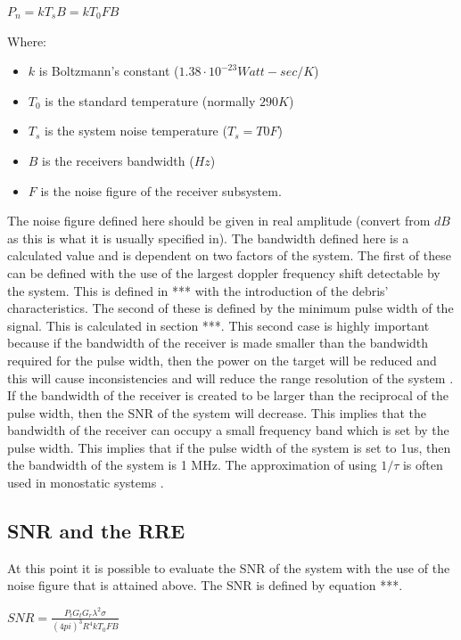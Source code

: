 \documentclass[11pt]{witseiepaper}
\begin{document}
$P_{n} = k T_{s} B = k T_{0} F B$

Where:
\begin{itemize}
    \item $k$ is Boltzmann's constant ($1.38 \cdot 10^{-23} Watt-sec/K$)
    \item $T_{0}$ is the standard temperature (normally $290 K$)
    \item $T_{s}$ is the system noise temperature ($T_{s} = T{0} F$)
    \item $B$ is the receivers bandwidth ($Hz$)
    \item $F$ is the noise figure of the receiver subsystem.
\end{itemize}

The noise figure defined here should be given in real amplitude (convert from $dB$ as this is what it is usually specified in).
The bandwidth defined here is a calculated value and is dependent on two factors of the system.
The first of these can be defined with the use of the largest doppler frequency shift detectable by the system. This is defined in *** with the introduction of the debris' characteristics.
The second of these is defined by the minimum pulse width of the signal. This is calculated in section ***. 
This second case is highly important because if the bandwidth of the receiver is made smaller than the bandwidth required for the pulse width, then the power on the target will be reduced and this will cause inconsistencies and will reduce the range resolution of the system \cite[p.~65]{radarHandbook}. If the bandwidth of the receiver is created to be larger than the reciprocal of the pulse width, then the SNR of the system will decrease. This implies that the bandwidth of the receiver can occupy a small frequency band which is set by the pulse width. This implies that if the pulse width of the system is set to 1us, then the bandwidth of the system is 1 MHz.
The approximation of using $1/\tau$ is often used in monostatic systems \cite[p.~65]{radarHandbook}.

\subsection{SNR and the RRE}

At this point it is possible to evaluate the SNR of the system with the use of the noise figure that is attained above.
The SNR is defined by equation ***.

$SNR = \frac{P_{t} G_{t} G_{r} \lambda^2 \sigma}{(4 pi)^3 R^4 k T_0 F B}$
\end{document}
